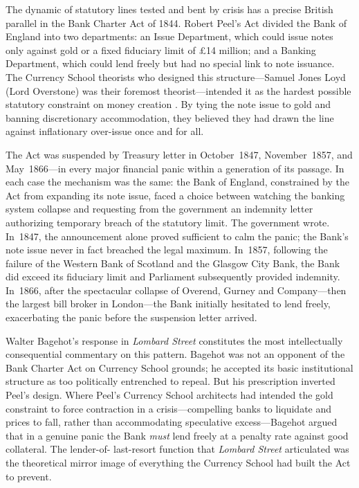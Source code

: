 \documentclass[12pt]{article}
\begin{document}
The dynamic of statutory lines tested and bent by crisis has a precise
British parallel in the Bank Charter Act of 1844.  Robert Peel's Act
divided the Bank of England into two departments: an Issue Department,
which could issue notes only against gold or a fixed fiduciary limit of
\pounds 14 million; and a Banking Department, which could lend freely
but had no special link to note issuance.  The Currency School theorists
who designed this structure---Samuel Jones Loyd (Lord Overstone) was
their foremost theorist---intended it as the hardest possible statutory
constraint on money creation \citep{Fetter1965}.  By tying the note
issue to gold and banning discretionary accommodation, they believed they
had drawn the line against inflationary over-issue once and for all.

The Act was suspended by Treasury letter in October~1847,
November~1857, and May~1866---in every major financial panic within a
generation of its passage.  In each case the mechanism was the same:
the Bank of England, constrained by the Act from expanding its note
issue, faced a choice between watching the banking system collapse and
requesting from the government an indemnity letter authorizing temporary
breach of the statutory limit.  The government wrote.  In~1847, the
announcement alone proved sufficient to calm the panic; the Bank's note
issue never in fact breached the legal maximum.  In~1857, following the
failure of the Western Bank of Scotland and the Glasgow City Bank, the
Bank did exceed its fiduciary limit and Parliament subsequently provided
indemnity.  In~1866, after the spectacular collapse of Overend, Gurney
and Company---then the largest bill broker in London---the Bank
initially hesitated to lend freely, exacerbating the panic before the
suspension letter arrived.

Walter Bagehot's response in \textit{Lombard Street} \citep{Bagehot1873}
constitutes the most intellectually consequential commentary on this
pattern.  Bagehot was not an opponent of the Bank Charter Act on
Currency School grounds; he accepted its basic institutional structure
as too politically entrenched to repeal.  But his prescription inverted
Peel's design.  Where Peel's Currency School architects had intended the
gold constraint to force contraction in a crisis---compelling banks to
liquidate and prices to fall, rather than accommodating speculative
excess---Bagehot argued that in a genuine panic the Bank \emph{must}
lend freely at a penalty rate against good collateral.  The lender-of-
last-resort function that \textit{Lombard Street} articulated was the
theoretical mirror image of everything the Currency School had built the
Act to prevent.
\end{document}
